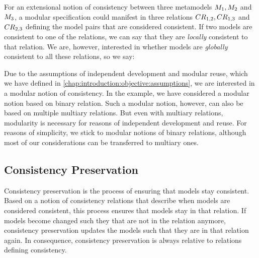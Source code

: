 For an extensional notion of consistency between three metamodels $\metamodel{M}{1}, \metamodel{M}{2}$ and $\metamodel{M}{3}$, a modular specification could manifest in three relations $\consistencyrelation{CR}{1,2}, \consistencyrelation{CR}{1,3}$ and $\consistencyrelation{CR}{2,3}$ defining the model pairs that are considered consistent.
If two models are consistent to one of the relations, we can say that they are \emph{locally} consistent to that relation.
We are, however, interested in whether models are \emph{globally} consistent to all these relations, so we say:
%

Due to the assumptions of independent development and modular reuse, which we have defined in \autoref{chap:introduction:objective:assumptions}, we are interested in a modular notion of consistency.
In the example, we have considered a modular notion based on binary relation. Such a modular notion, however, can also be based on multiple multiary relations. 
But even with multiary relations, modularity is necessary for reasons of independent development and reuse.
For reasons of simplicity, we stick to modular notions of binary relations, although most of our considerations can be transferred to multiary ones.


\subsection{Consistency Preservation}
\label{chap:correctness:notions_consistency:preservation}

Consistency preservation is the process of ensuring that models stay consistent.
Based on a notion of consistency relations that describe when models are considered consistent, this process ensures that models stay in that relation. 
If models become changed such they that are not in the relation anymore, consistency preservation updates the models such that they are in that relation again.
In consequence, consistency preservation is always relative to relations defining consistency.

